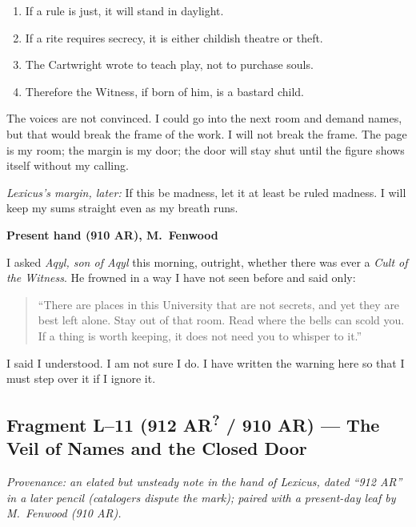 \documentclass[11pt]{article}
\begin{document}
\begin{enumerate}\setlength\itemsep{0.25em}
  \item If a rule is just, it will stand in daylight.
  \item If a rite requires secrecy, it is either childish theatre or theft.
  \item The Cartwright wrote to teach play, not to purchase souls.
  \item Therefore the Witness, if born of him, is a bastard child.
\end{enumerate}

The voices are not convinced. I could go into the next room and demand names, but that would break the frame of the work. I will not break the frame. The page is my room; the margin is my door; the door will stay shut until the figure shows itself without my calling.

\medskip
\noindent\textit{Lexicus’s margin, later:} If this be madness, let it at least be ruled madness. I will keep my sums straight even as my breath runs.

\medskip
\noindent\textbf{Present hand (910 AR), M.\ Fenwood}

I asked \textit{Aqyl, son of Aqyl} this morning, outright, whether there was ever a \emph{Cult of the Witness}. He frowned in a way I have not seen before and said only:

\begin{quote}\small
``There are places in this University that are not secrets, and yet they are best left alone. Stay out of that room. Read where the bells can scold you. If a thing is worth keeping, it does not need you to whisper to it.''
\end{quote}

I said I understood. I am not sure I do. I have written the warning here so that I must step over it if I ignore it.

\subsection{Fragment L--11 (912 AR\textsuperscript{?} / 910 AR) --- The Veil of Names and the Closed Door}
\label{frag:l11}
{}

\noindent\textit{Provenance: an elated but unsteady note in the hand of Lexicus, dated ``912 AR'' in a later pencil (catalogers dispute the mark); paired with a present-day leaf by M.\ Fenwood (910 AR).}
\end{document}
